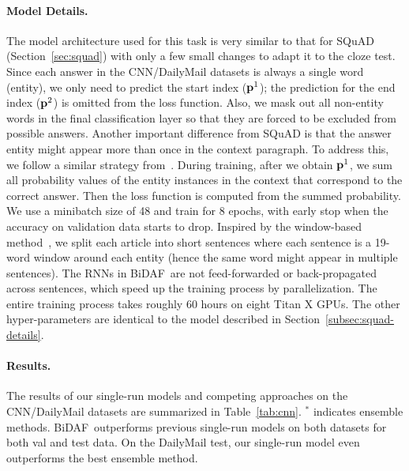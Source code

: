 \documentclass{article} \usepackage{iclr2017_conference,times}
\newcommand{\sysshort}{\mbox{\sc BiDAF}}
\begin{document}
\paragraph{Model Details.}\label{subsec:cnn-details}
The model architecture used for this task is very similar to that for SQuAD (Section~\ref{sec:squad}) with only a few small changes to adapt it to the cloze test. 
Since each answer in the CNN/DailyMail datasets is always a single word (entity), we only need to predict the start index (${\bf p}^1$); the prediction for the end index (${\bf p}^2$) is omitted from the loss function. 
Also, we mask out all non-entity words in the final classification layer so that they are forced to be excluded from possible answers. Another important difference from SQuAD is that the answer entity might appear more than once in the context paragraph. To address this, we follow a similar strategy from~\cite{kadlec2016text}. 
During training, after we obtain ${\bf p}^1$, we sum all probability values of the entity instances in the context that correspond to the correct answer. 
Then the loss function is computed from the summed probability.
We use a minibatch size of 48 and train for 8 epochs, with early stop when the accuracy on validation data starts to drop. 
Inspired by the window-based method~\citep{hill2015goldilocks}, 
we split each article into short sentences where each sentence is a 19-word window around each entity (hence the same word might appear in multiple sentences).
The RNNs in \sysshort\ are not feed-forwarded or back-propagated across sentences, which speed up the training process by parallelization.
The entire training process takes roughly 60 hours on eight Titan X GPUs. The other hyper-parameters are identical to the model described in Section~\ref{subsec:squad-details}.


\paragraph{Results.}




The results of our single-run models and competing approaches on the CNN/DailyMail datasets are summarized in Table~\ref{tab:cnn}. 
$^*$ indicates ensemble methods. 
\sysshort\ outperforms previous single-run models on both datasets for both val and test data. On the DailyMail test, our single-run model even outperforms the best ensemble method.
\end{document}
